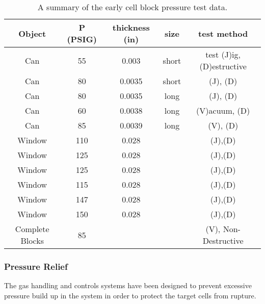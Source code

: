 {\begin{table}[htb]
\begin{center}
\begin{tabular}{|c|c|c|c|c|} \hline
Object & P (PSIG) & thickness (in) & size & test method \\ \hline
Can & 55  & 0.003 &short &test (J)ig, (D)estructive \\ \hline
Can & 80 & 0.0035 &short &(J), (D) \\ \hline
Can & 80 & 0.0035 &long &(J), (D) \\ \hline
Can & 60 & 0.0038 &long &(V)acuum, (D) \\ \hline
Can & 85 & 0.0039 &long &(V), (D) \\ \hline
Window & 110 &0.028& &(J),(D) \\ \hline
Window & 125 &0.028& &(J),(D) \\ \hline
Window & 125 &0.028& &(J),(D) \\ \hline
Window & 115 &0.028& &(J),(D) \\ \hline
Window & 147 &0.028& &(J),(D) \\ \hline
Window & 150 &0.028& &(J),(D) \\ \hline
Complete Blocks & 85 &&&(V), Non-Destructive \\ \hline
\end{tabular}
\end{center}
\caption[Cryotarget: Cell Pressure Test Data]{A summary of the early cell block pressure test data.}
\label{ta:test}
\end{table}

\subsubsection{ Pressure Relief}

The gas handling and controls systems have been designed to 
prevent excessive pressure build up in the system in order to
protect the target cells from rupture.

}
